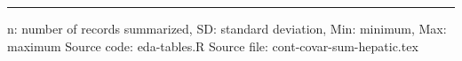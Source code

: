 \vspace{0.67cm}
 
\begin{minipage}{1\linewidth}
\linespread{1.1}\selectfont
\rule{1\linewidth}{0.4pt}
\vspace{0.02cm}
n: number of records summarized,
                 SD: standard deviation,
                 Min: minimum, Max: maximum \newline
Source code: eda-tables.R \newline
Source file: cont-covar-sum-hepatic.tex \newline
\end{minipage}
